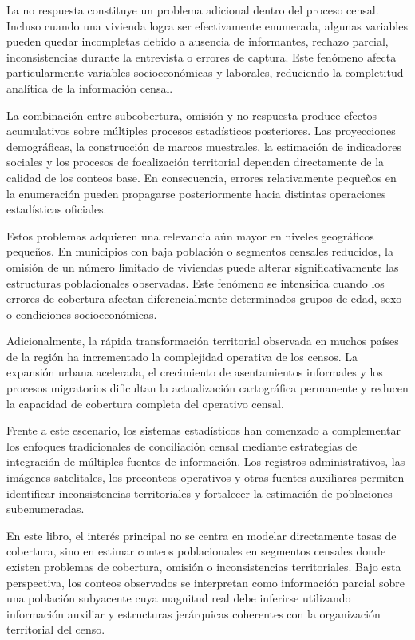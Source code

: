 \documentclass[
  spanish,
]{book}
\begin{document}
La no respuesta constituye un problema adicional dentro del proceso censal. Incluso cuando una vivienda logra ser efectivamente enumerada, algunas variables pueden quedar incompletas debido a ausencia de informantes, rechazo parcial, inconsistencias durante la entrevista o errores de captura. Este fenómeno afecta particularmente variables socioeconómicas y laborales, reduciendo la completitud analítica de la información censal.

La combinación entre subcobertura, omisión y no respuesta produce efectos acumulativos sobre múltiples procesos estadísticos posteriores. Las proyecciones demográficas, la construcción de marcos muestrales, la estimación de indicadores sociales y los procesos de focalización territorial dependen directamente de la calidad de los conteos base. En consecuencia, errores relativamente pequeños en la enumeración pueden propagarse posteriormente hacia distintas operaciones estadísticas oficiales.

Estos problemas adquieren una relevancia aún mayor en niveles geográficos pequeños. En municipios con baja población o segmentos censales reducidos, la omisión de un número limitado de viviendas puede alterar significativamente las estructuras poblacionales observadas. Este fenómeno se intensifica cuando los errores de cobertura afectan diferencialmente determinados grupos de edad, sexo o condiciones socioeconómicas.

Adicionalmente, la rápida transformación territorial observada en muchos países de la región ha incrementado la complejidad operativa de los censos. La expansión urbana acelerada, el crecimiento de asentamientos informales y los procesos migratorios dificultan la actualización cartográfica permanente y reducen la capacidad de cobertura completa del operativo censal.

Frente a este escenario, los sistemas estadísticos han comenzado a complementar los enfoques tradicionales de conciliación censal mediante estrategias de integración de múltiples fuentes de información. Los registros administrativos, las imágenes satelitales, los preconteos operativos y otras fuentes auxiliares permiten identificar inconsistencias territoriales y fortalecer la estimación de poblaciones subenumeradas.

En este libro, el interés principal no se centra en modelar directamente tasas de cobertura, sino en estimar conteos poblacionales en segmentos censales donde existen problemas de cobertura, omisión o inconsistencias territoriales. Bajo esta perspectiva, los conteos observados se interpretan como información parcial sobre una población subyacente cuya magnitud real debe inferirse utilizando información auxiliar y estructuras jerárquicas coherentes con la organización territorial del censo.
\end{document}
